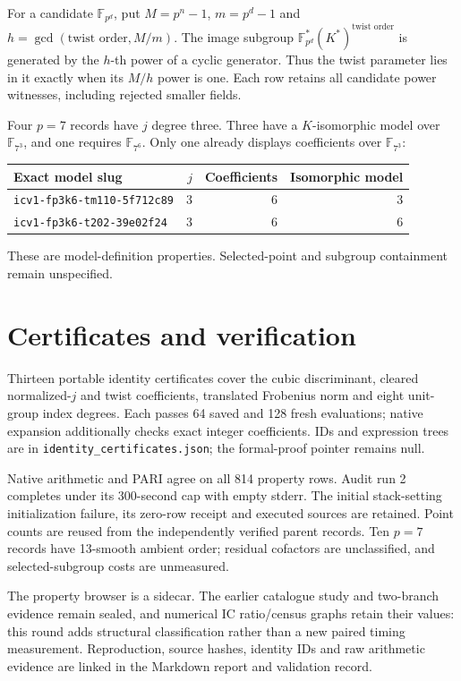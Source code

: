 \documentclass[10pt]{article}
\begin{document}
For a candidate $\mathbb F_{p^d}$, put $M=p^n-1$, $m=p^d-1$ and $h=\gcd(\text{twist order},M/m)$. The image subgroup $\mathbb F_{p^d}^{*}(K^{*})^{\text{twist order}}$ is generated by the $h$-th power of a cyclic generator. Thus the twist parameter lies in it exactly when its $M/h$ power is one. Each row retains all candidate power witnesses, including rejected smaller fields.

Four $p=7$ records have $j$ degree three. Three have a $K$-isomorphic model over $\mathbb F_{7^3}$, and one requires $\mathbb F_{7^6}$. Only one already displays coefficients over $\mathbb F_{7^3}$:
\begin{center}\begin{tabular}{lrrr}\toprule Exact model slug & $j$ & Coefficients & Isomorphic model\\\midrule
\texttt{icv1-fp3k6-tm110-5f712c89} &3&6&3\\
\texttt{icv1-fp3k6-t202-39e02f24} &3&6&6\\\bottomrule\end{tabular}\end{center}
These are model-definition properties. Selected-point and subgroup containment remain unspecified.
\section{Certificates and verification}
Thirteen portable identity certificates cover the cubic discriminant, cleared normalized-$j$ and twist coefficients, translated Frobenius norm and eight unit-group index degrees. Each passes 64 saved and 128 fresh evaluations; native expansion additionally checks exact integer coefficients. IDs and expression trees are in \texttt{identity\_certificates.json}; the formal-proof pointer remains null.

Native arithmetic and PARI agree on all 814 property rows. Audit run 2 completes under its 300-second cap with empty stderr. The initial stack-setting initialization failure, its zero-row receipt and executed sources are retained. Point counts are reused from the independently verified parent records. Ten $p=7$ records have 13-smooth ambient order; residual cofactors are unclassified, and selected-subgroup costs are unmeasured.

The property browser is a sidecar. The earlier catalogue study and two-branch evidence remain sealed, and numerical IC ratio/census graphs retain their values: this round adds structural classification rather than a new paired timing measurement. Reproduction, source hashes, identity IDs and raw arithmetic evidence are linked in the Markdown report and validation record.
\end{document}
